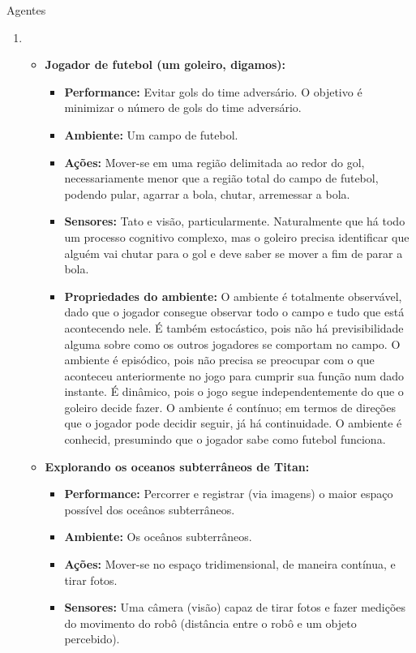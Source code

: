 \documentclass{article}
\begin{document}
Agentes

\begin{enumerate}
	\item 
		\begin{itemize}
			\item \textbf{Jogador de futebol (um goleiro, digamos):}
				\begin{itemize}
					\item \textbf{Performance:} Evitar gols do time adversário. O objetivo é minimizar o número de gols do time adversário.
					\item \textbf{Ambiente:} Um campo de futebol.
					\item \textbf{Ações:} Mover-se em uma região delimitada ao redor do gol, necessariamente menor que a região total do campo de futebol, podendo pular, agarrar a bola, chutar, arremessar a bola.
					\item \textbf{Sensores:} Tato e visão, particularmente. Naturalmente que há todo um processo cognitivo complexo, mas o goleiro precisa identificar que alguém vai chutar para o gol e deve saber se mover a fim de parar a bola.
					\item \textbf{Propriedades do ambiente:} O ambiente é totalmente observável, dado que o jogador consegue observar todo o campo e tudo que está acontecendo nele. É também estocástico, pois não há previsibilidade alguma sobre como os outros jogadores se comportam no campo. O ambiente é episódico, pois não precisa se preocupar com o que aconteceu anteriormente no jogo para cumprir sua função num dado instante. É dinâmico, pois o jogo segue independentemente do que o goleiro decide fazer. O ambiente é contínuo; em termos de direções que o jogador pode decidir seguir, já há continuidade. O ambiente é conhecid, presumindo que o jogador sabe como futebol funciona.
				\end{itemize}
			\item \textbf{Explorando os oceanos subterrâneos de Titan:}
				\begin{itemize}
					\item \textbf{Performance:} Percorrer e registrar (via imagens) o maior espaço possível dos oceânos subterrâneos.
					\item \textbf{Ambiente:} Os oceânos subterrâneos.
					\item \textbf{Ações:} Mover-se no espaço tridimensional, de maneira contínua, e tirar fotos.
					\item \textbf{Sensores:} Uma câmera (visão) capaz de tirar fotos e fazer medições do movimento do robô (distância entre o robô e um objeto percebido).

\end{itemize}
\end{itemize}
\end{enumerate}
\end{document}
